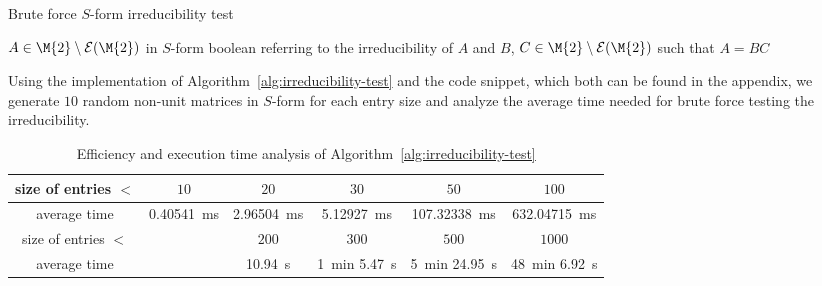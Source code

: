 \begin{breakablealgorithm}
\caption{Brute force $S$-form irreducibility test}\label{alg:irreducibility-test}
\begin{algorithmic}[1]
\Require $A \in \M{2}\setminus\mathcal{E}(\M{2})$ in $S$-form
\Ensure boolean referring to the irreducibility of $A$ and $B$, $C \in \M{2}\setminus\mathcal{E}(\M{2})$ such that $A=BC$ 
 
\EndIf
\EndFor
\EndFor
{}
\EndFunction
\end{algorithmic}
\end{breakablealgorithm}

Using the implementation of Algorithm~\ref{alg:irreducibility-test} and the code snippet, which both can be found in the appendix, we generate $10$ random non-unit matrices in $S$-form for each entry size and analyze the average time needed for brute force testing the irreducibility. 

\begin{table}[htbp]
\begin{center}
\begin{tabular}{c|c c c c c} 
size of entries $<$ & $10$ & $20$ & $30$ & $50$ & $100$ \\ \hline 
average time & \SI{0.40541}{\milli\second} & \SI{2.96504}{\milli\second} & \SI{5.12927}{\milli\second} & \SI{107.32338}{\milli\second} & \SI{632.04715}{\milli\second} \\ \hline \hline
size of entries $<$ & & $200$ & $300$ & $500$ & $1000$ \\ \hline
average time & & \SI{10.94}{\second} & \SI{1}{\minute} \SI{5.47}{\second} & \SI{5}{\minute} \SI{24.95}{\second} & \SI{48}{\minute} \SI{6.92}{\second} \\
\end{tabular} \caption{Efficiency and execution time analysis of Algorithm~\ref{alg:irreducibility-test}}\label{table:efficiency}
\end{center}
\end{table}

